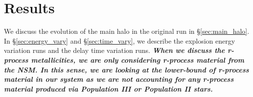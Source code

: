 \documentclass[fleqn,usenatbib]{mnras}
\begin{document}


\section{Results} \label{sec:results}

We discuss the evolution of the main halo in the original run in \S \ref{sec:main_halo}. In \S \ref{sec:energy_vary} and \S \ref{sec:time_vary}, we describe the explosion energy variation runs and the delay time variation runs. \textbf{\textit{When we discuss the r-process metallicities, we are only considering r-process material from the NSM. In this sense, we are looking at the lower-bound of r-process material in our system as we are not accounting for any r-process material produced via Population III or Population II stars.}}
\end{document}
